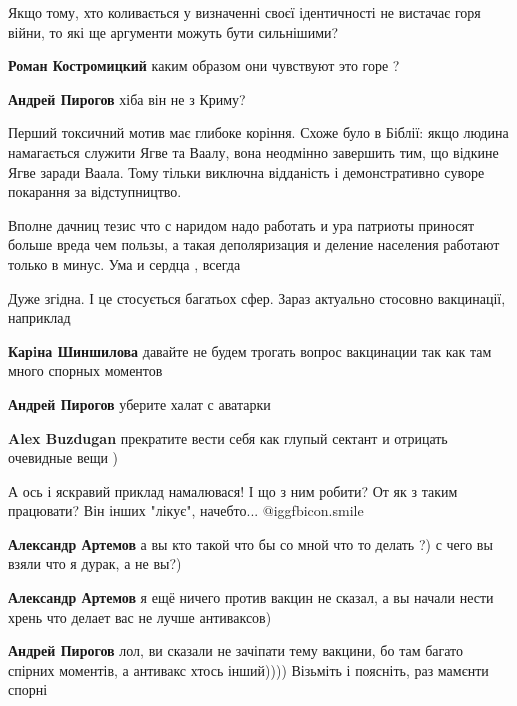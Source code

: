 \begin{itemize}
Якщо тому, хто коливається у визначенні своєї ідентичності не вистачає горя війни, то які ще аргументи можуть бути сильнішими?

\begin{itemize} %
\textbf{Роман Костромицкий} каким образом они чувствуют это горе ?

\textbf{Андрей Пирогов} хіба він не з Криму?
\end{itemize} %


Перший токсичний мотив має глибоке коріння. Схоже було в Біблії: якщо людина
намагається служити Ягве та Ваалу, вона неодмінно завершить тим, що відкине
Ягве заради Ваала. Тому тільки виключна відданість і демонстративно суворе
покарання за відступництво.



Вполне дачниц тезис что с наридом надо работать и ура патриоты приносят больше
вреда чем пользы, а такая деполяризация и деление населения работают только в
минус. Ума и сердца , всегда

Дуже згідна.
І це стосується багатьох сфер.
Зараз актуально стосовно вакцинації, наприклад

\begin{itemize} %
\textbf{Карiна Шиншилова} давайте не будем трогать вопрос вакцинации так как там много спорных моментов

\textbf{Андрей Пирогов} уберите халат с аватарки

\textbf{Alex Buzdugan} прекратите вести себя как глупый сектант и отрицать очевидные вещи )

А ось і яскравий приклад намалювася!
І що з ним робити? От як з таким працювати? Він інших "лікує", начебто...  @igg{fbicon.smile} 

\textbf{Александр Артемов} а вы кто такой что бы со мной что то делать ?) с чего вы взяли что я дурак, а не вы?)

\textbf{Александр Артемов} я ещё ничего против вакцин не сказал, а вы начали нести хрень что делает вас не лучше антиваксов)

\textbf{Андрей Пирогов} лол, ви сказали не зачіпати тему вакцини, бо там багато спірних моментів, а антивакс хтось інший))))
Візьміть і поясніть, раз мамєнти спорні


\end{itemize}
\end{itemize}
